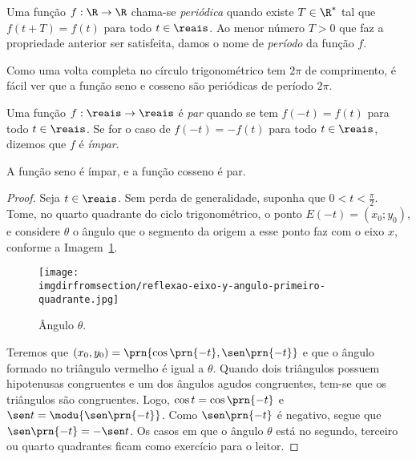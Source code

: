 \begin{definition}
\label{def:funcao-periodica}
	Uma função $f: \R \to \R$ chama-se \emph{periódica} quando existe $T
\in \R^\ast$ tal que $f(t + T) = f(t)$ para todo $t \in \reais$. Ao
menor número $T>0$ que faz a propriedade anterior ser satisfeita,
damos o nome de \emph{período} da função $f$.
\end{definition}

\begin{remark}
	Como uma volta completa no círculo trigonométrico tem $2 \pi$ de
comprimento, é fácil ver que a função seno e cosseno são periódicas
de período $2\pi$.
\end{remark}

\begin{definition}
\label{def:funcao-par-impar}
	Uma função $f: \reais \to \reais$ é \emph{par} quando se tem $f(-t) = f(t)$
para todo $t\in \reais$. Se for o caso de $f(-t) = - f(t)$ para todo $t
\in \reais$, dizemos que $f$ é \emph{ímpar}.
\end{definition}

 \begin{proposition}
	 A função seno é ímpar, e a função cosseno é par.
 \end{proposition}

\begin{proof}
	Seja $t \in \reais$. Sem perda de generalidade, suponha que $0 < t < \frac \pi 2$.
	Tome, no quarto quadrante do ciclo trigonométrico, o ponto $E(-t) = (x_0; y_0)$, e considere 
	$\theta$ o ângulo que o segmento da origem a esse ponto faz com o eixo $x$, conforme a Imagem~\ref{img:reflexao-eixo-y-angulo-primeiro-quadrante}.
	\begin{figure}[H]
		\centering
		\texttt{[image: \\imgdirfromsection/reflexao-eixo-y-angulo-primeiro-quadrante.jpg]}
		\caption{Ângulo $\theta$.}
		\label{img:reflexao-eixo-y-angulo-primeiro-quadrante}
	\end{figure}
	Teremos que $(x_0, y_0) =\prn{\cos\prn{-t}, \sen\prn{-t}}$ e que o ângulo formado no triângulo vermelho é igual a $\theta$.
	Quando dois triângulos possuem hipotenusas congruentes e um dos ângulos agudos congruentes, tem-se que os triângulos são congruentes.
	Logo, $\cos t = \cos\prn{-t}$ e $\sen t = \modu{\sen\prn{- t}}$. Como $\sen\prn{-t}$ é negativo, segue que 
	$\sen\prn{-t} = -\sen t$. Os casos em que o ângulo $\theta$ está no segundo, terceiro ou quarto quadrantes ficam como exercício 
	para o leitor.
\end{proof}

